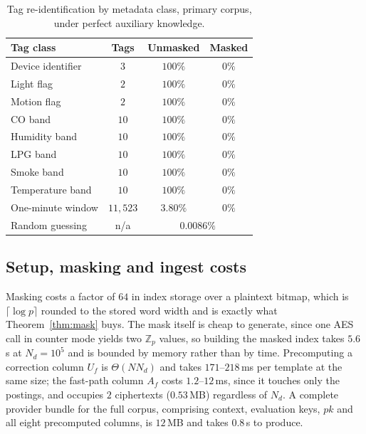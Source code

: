 \documentclass[a4paper,fleqn]{cas-dc}
\begin{document}
\begin{table}[pos=t]
\caption{Tag re-identification by metadata class, primary corpus, under
perfect auxiliary knowledge.}
\label{tab:leakage}
\centering
\footnotesize
\setlength{\tabcolsep}{3pt}
\renewcommand{\arraystretch}{1.15}
\begin{tabular*}{\tblwidth}{@{\extracolsep{\fill}}lccc@{}}
\toprule
Tag class & Tags & Unmasked & Masked \\
\midrule
Device identifier      & $3$      & $100\%$ & $0\%$ \\
Light flag             & $2$      & $100\%$ & $0\%$ \\
Motion flag            & $2$      & $100\%$ & $0\%$ \\
CO band                & $10$     & $100\%$ & $0\%$ \\
Humidity band          & $10$     & $100\%$ & $0\%$ \\
LPG band               & $10$     & $100\%$ & $0\%$ \\
Smoke band             & $10$     & $100\%$ & $0\%$ \\
Temperature band       & $10$     & $100\%$ & $0\%$ \\
One-minute window      & $11{,}523$ & $3.80\%$ & $0\%$ \\
\midrule
Random guessing        & n/a      & \multicolumn{2}{c}{$0.0086\%$} \\
\bottomrule
\end{tabular*}
\end{table}

\subsection{Setup, masking and ingest costs}
\label{sec:setupresult}
Masking costs a factor of $64$ in index storage over a plaintext bitmap, which
is $\lceil\log p\rceil$ rounded to the stored word width and is exactly what
Theorem~\ref{thm:mask} buys. The mask itself is cheap to generate, since one
AES call in counter mode yields two $\mathbb{Z}_p$ values, so building the
masked index takes $5.6$\,s at $N_d=10^5$ and is bounded by memory rather than
by time. Precomputing a correction column $U_f$ is $\Theta(N N_d)$ and takes
$171$--$218$\,ms per template at the same size; the fast-path column $A_f$
costs $1.2$--$12$\,ms, since it touches only the postings, and occupies $2$
ciphertexts ($0.53$\,MB) regardless of $N_d$. A complete provider bundle for
the full corpus, comprising context, evaluation keys, $pk$ and all eight
precomputed columns, is $12$\,MB and takes $0.8$\,s to produce.
\end{document}
